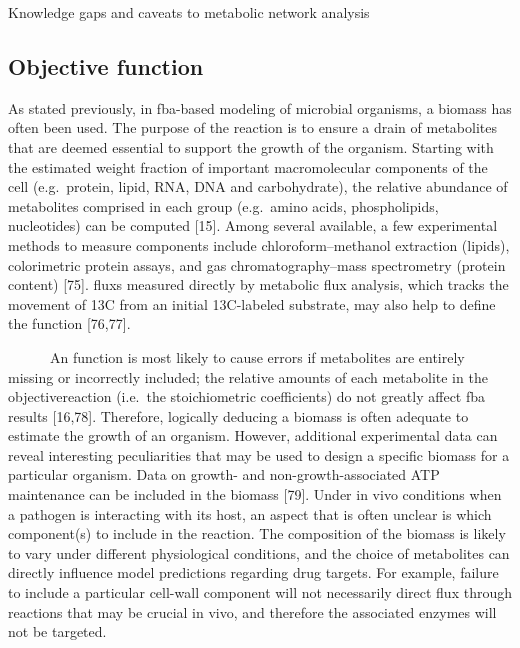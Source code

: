 \begin{pabox}[label=trends:box:caveats]{Knowledge gaps and caveats to metabolic network analysis}
\subsection*{Objective function}
As stated previously, in \gls{fba}-based modeling of microbial organisms, 
a \gls{biomass} has often been used. The purpose of 
the reaction is to ensure a drain of metabolites that 
are deemed essential to support the growth of the 
organism. Starting with the estimated weight fraction 
of important macromolecular components of the cell 
(e.g.\ protein, lipid, RNA, DNA and carbohydrate), the 
relative abundance of metabolites comprised in each 
group (e.g.\ amino acids, phospholipids, nucleotides) 
can be computed [15]. Among several available, a few 
experimental methods to measure  components 
include chloroform–methanol extraction (lipids), 
colorimetric protein assays, and gas chromatography–mass 
spectrometry (protein content) [75]. \Glspl{flux} measured 
directly by metabolic flux analysis, which tracks 
the movement of 13C from an initial 13C-labeled 
substrate, may also help to define the  
function [76,77].

~~~~~~An  function is most likely to cause 
errors if metabolites are entirely missing or 
incorrectly included; the relative amounts of each 
metabolite in the \gls{objectivereaction} (i.e.\ the 
stoichiometric coefficients) do not greatly affect 
\gls{fba} results [16,78]. Therefore, logically 
deducing a \gls{biomass} is often adequate 
to estimate the growth of an organism. However, 
additional experimental data can reveal interesting 
peculiarities that may be used to design a specific 
\gls{biomass} for a particular organism. 
Data on growth- and non-growth-associated ATP 
maintenance can be included in the \gls{biomass} [79]. Under in vivo conditions when a 
pathogen is interacting with its host, an aspect 
that is often unclear is which  component(s) 
to include in the reaction. The composition of the 
\gls{biomass} is likely to vary under different 
physiological conditions, and the choice of metabolites 
can directly influence model predictions regarding 
drug targets. For example, failure to include a 
particular cell-wall component will not necessarily 
direct \gls{flux} through reactions that may be crucial in 
vivo, and therefore the associated enzymes will not 
be targeted.
\end{pabox}
